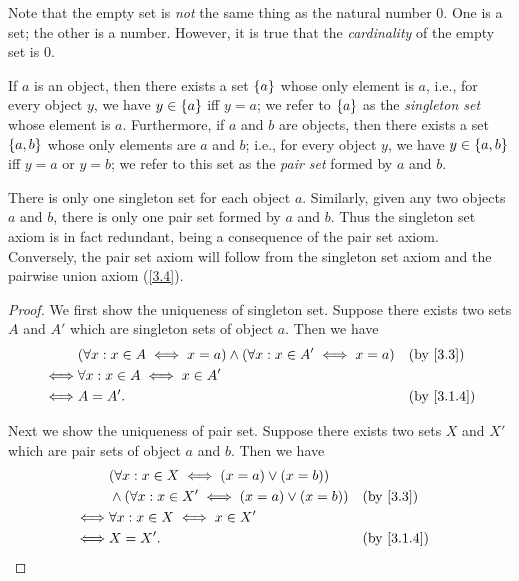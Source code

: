 \begin{rmk}\label{3.1.8}
  Note that the empty set is \emph{not} the same thing as the natural number \(0\).
  One is a set;
  the other is a number.
  However, it is true that the \emph{cardinality} of the empty set is \(0\).
\end{rmk}

\begin{ax}\label{3.3}
  If \(a\) is an object, then there exists a set \(\left\lbrace a\right\rbrace\) whose only element is \(a\), i.e., for every object \(y\), we have \(y \in \left\lbrace a\right\rbrace\) iff \(y = a\);
  we refer to \(\left\lbrace a\right\rbrace\) as the \emph{singleton set} whose element is \(a\).
  Furthermore, if \(a\) and \(b\) are objects, then there exists a set \(\left\lbrace a, b\right\rbrace\) whose only elements are \(a\) and \(b\);
  i.e., for every object \(y\), we have \(y \in \left\lbrace a, b\right\rbrace\) iff \(y = a\) or \(y = b\);
  we refer to this set as the \emph{pair set} formed by \(a\) and \(b\).
\end{ax}

\begin{rmk}\label{3.1.9}
  There is only one singleton set for each object \(a\).
  Similarly, given any two objects \(a\) and \(b\), there is only one pair set formed by \(a\) and \(b\).
  Thus the singleton set axiom is in fact redundant, being a consequence of the pair set axiom.
  Conversely, the pair set axiom will follow from the singleton set axiom and the pairwise union axiom (\cref{3.4}).
\end{rmk}

\begin{proof}
  We first show the uniqueness of singleton set.
  Suppose there exists two sets \(A\) and \(A'\) which are singleton sets of object \(a\).
  Then we have
  \begin{align*}
         & (\forall x : x \in A \iff x = a) \land (\forall x : x \in A' \iff x = a) &  & \text{(by \cref{3.3})} \\
    \iff & \forall x : x \in A \iff x \in A'                                                                    \\
    \iff & A = A'.                                                                  &  & \by{3.1.4}
  \end{align*}

  Next we show the uniqueness of pair set.
  Suppose there exists two sets \(X\) and \(X'\) which are pair sets of object \(a\) and \(b\).
  Then we have
  \begin{align*}
         & (\forall x : x \in X \iff (x = a) \lor (x = b))                                    \\
         & \land (\forall x : x \in X' \iff (x = a) \lor (x = b)) &  & \text{(by \cref{3.3})} \\
    \iff & \forall x : x \in X \iff x \in X'                                                  \\
    \iff & X = X'.                                                &  & \by{3.1.4}
  \end{align*}
\end{proof}

